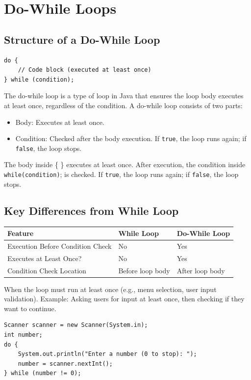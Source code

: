 \documentclass[letterpaper,12pt]{article}
\begin{document}
\section{Do-While Loops}
\subsection{Structure of a Do-While Loop}
\begin{verbatim}
do {
    // Code block (executed at least once)
} while (condition);
\end{verbatim}
The do-while loop is a type of loop in Java that ensures the loop body executes at least once, regardless of the condition. A do-while loop consists of two parts:
\begin{itemize}
    \item Body: Executes at least once.
    \item Condition: Checked after the body execution. If \texttt{true}, the loop runs again; if \texttt{false}, the loop stops.
\end{itemize}
The body inside \{ \} executes at least once. After execution, the condition inside \texttt{while(condition)}; is checked. If \texttt{true}, the loop runs again; if \texttt{false}, the loop stops.
\subsection{Key Differences from While Loop}

\begin{center}
\begin{tabular}{|l|l|l|}
\hline
\textbf{Feature} & \textbf{While Loop} & \textbf{Do-While Loop} \\ \hline
Execution Before Condition Check & No & Yes \\ \hline
Executes at Least Once? & No & Yes \\ \hline
Condition Check Location & Before loop body & After loop body \\ \hline
\end{tabular}
\end{center}
When the loop must run at least once (e.g., menu selection, user input validation). Example: Asking users for input at least once, then checking if they want to continue.
\begin{verbatim}
Scanner scanner = new Scanner(System.in);
int number;
do {
    System.out.println("Enter a number (0 to stop): ");
    number = scanner.nextInt();
} while (number != 0);
\end{verbatim}
\end{document}
